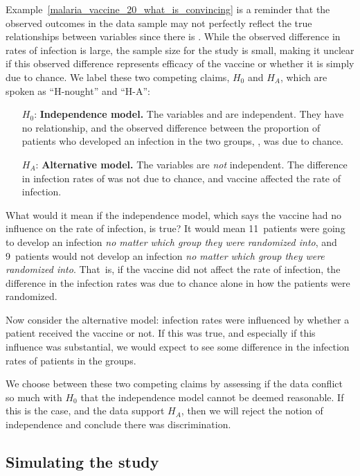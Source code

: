 Example~\ref{malaria_vaccine_20_what_is_convincing}
is a reminder that the observed outcomes in the data
sample may not perfectly reflect the true relationships
between variables since there is .
While the observed difference in rates of infection
is large, the sample size for the study is small,
making it unclear if this observed difference represents
efficacy of the vaccine or whether it is simply due to
chance.
We label these two competing claims, $H_0$ and $H_A$,
which are spoken as ``H-nought'' and ``H-A'':
\begin{itemize}
\setlength{\itemsep}{0mm}
\item[$H_0$:] \textbf{Independence model.}
    The variables  and 
    are independent.
    They have no relationship, and the observed difference
    between the proportion of patients who developed
    an infection in the two groups, \malariaIRDiffPerc{},
    was due to chance.
\item[$H_A$:] \textbf{Alternative model.}
    The variables are \emph{not} independent.
    The difference in infection rates of
    \malariaIRDiffPerc{}
    was not due to chance,
    and vaccine affected the rate of infection.
\end{itemize}

What would it mean if the independence model,
which says the vaccine had no influence on the
rate of infection, is true?
It would mean 11~patients were going to
develop an infection \emph{no matter which group
they were randomized into},
and 9~patients would not develop an infection
\emph{no matter which group they were randomized
into}.
That~is, if the vaccine did not affect the rate
of infection, the difference in the infection rates
was due to chance alone in how the patients were
randomized.

Now consider the alternative model:
infection rates were influenced by whether a patient
received the vaccine or not.
If this was true, and especially if this influence
was substantial, we would expect to see some difference
in the infection rates of patients in the groups.

We choose between these two competing claims
by assessing if the data conflict so much with
$H_0$ that the independence model cannot be deemed
reasonable.
If this is the case, and the data support $H_A$,
then we will reject the notion of independence
and conclude there was discrimination.


\subsection{Simulating the study}
\label{simulatingTheStudy}

